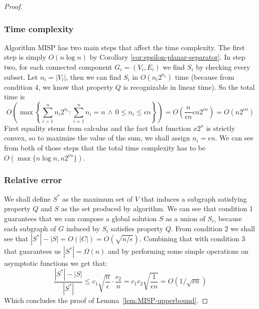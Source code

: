 \begin{proof}
    \subsubsection{Time complexity}
    Algorithm \textsc{MISP} has two main steps that affect the time complexity. The
    first step is simply $O(n \log n)$ by Corollary
    \ref{cor:epsilon-planar-separator}. In step two, for each connected
    component $G_i = (V_i, E_i)$ we find $S_i$ by checking every subset. Let 
    $n_i = |V_i|$,
    then we can find $S_i$ in $O(n_i 2^{n_i})$ time (because from condition 4,
    we know that property $Q$ is recognizable in linear time). So the total time is
    $$
    O\left(\max \left\{ \sum_{i=1}^n n_i 2^{n_i} \colon \sum_{i=1}^n n_i = n \, \land \, 0 \leq n_i
    \leq \epsilon n \right\} \right) = O\left( \frac{n}{\epsilon n} \epsilon n 2^{\epsilon n}
    \right) = O(n 2^{\epsilon n})
    $$
    First equality stems from calculus and the fact that function $x2^x$ is
    strictly convex, so to maximize the value of the sum, we shall assign $n_i =
    \epsilon n$. We can see from both of those steps that the total time
    complexity has to be $O(\max\{ n \log n, n 2^{\epsilon n} \})$.

    \subsubsection{Relative error}
    We shall define $S^*$ as the maximum set of $V$ that induces a subgraph
    satisfying property $Q$ and $S$ as the set produced by algorithm. We can see
    that condition 1 guarantees that we can compose a global solution $S$ as a
    union of $S_i$, because each subgraph of $G$ induced by $S_i$ satisfies
    property $Q$. From condition 2 we shall see that $|S^*| - |S| = O(|C|) =
    O(\sqrt{n/ \epsilon})$. Combining that with condition 3 that guarantees
    us $|S^*| = \Omega(n)$ and by performing some simple operations on
    asymptotic functions we get that:
$$
\frac{|S^*| - |S|}{|S^*|} \leq c_1 \sqrt{ \frac{n}{\epsilon} } \cdot
\frac{c_2}{n} = c_1c_2 \sqrt{ \frac{1}{\epsilon n} } = O(1/ \sqrt{\epsilon n})
$$
Which concludes the proof of Lemma~\ref{lem:MISP-upperbound}.
\end{proof}

